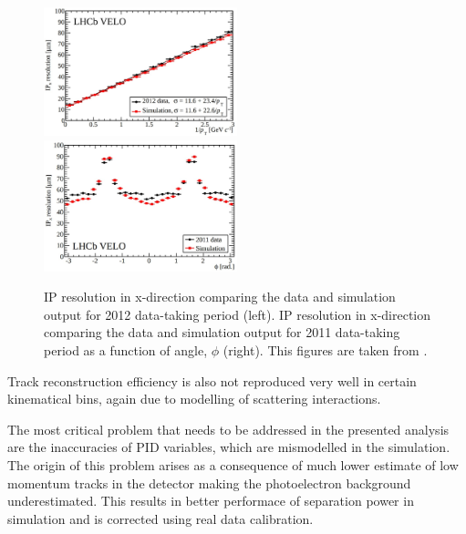 \begin{figure}[!h]
	\centering
	\includegraphics[width = 0.5\textwidth]{figs/detector/IPres.eps}%
	\includegraphics[width = 0.5\textwidth]{figs/detector/IPresAngle.eps}%
	\caption{\Gls{IP} resolution in x-direction comparing the data and simulation output for 2012 data-taking period (left). \Gls{IP} resolution in x-direction comparing the data and simulation output for 2011 data-taking period as a function of angle, $\phi$ (right). This figures are taken from \cite{LHCbVELOGroup:2014uea}. }  
	\label{fig:IPRES}
\end{figure}


Track reconstruction efficiency is also not reproduced very well in certain kinematical bins, again due to modelling of scattering interactions.

The most critical problem that needs to be addressed in the presented analysis are the inaccuracies of \Gls{PID} variables, which are mismodelled in the simulation. The origin of this problem arises as a consequence of much lower estimate of low momentum tracks in the detector making the photoelectron background underestimated. This results in better performace of separation power in simulation and is corrected using real data calibration.


